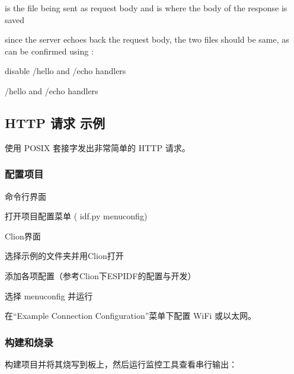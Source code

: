 \documentclass[a4paper,12pt,english]{sphinxmanual}
\begin{document}
{{\begin{sphinxVerbatim}[commandchars=\\\{\}]

 is the file being sent as request body and  is where the body of the response is saved

since the server echoes back the request body, the two files should be same, as can be confirmed using : 

 \PYGZhy{} disable /hello and /echo handlers

 \PYGZhy{}   /hello and /echo handlers
\end{sphinxVerbatim}


\subsection{HTTP 请求 示例}
\label{\detokenize{exp-esp32/http:http}}
\sphinxAtStartPar
使用 POSIX 套接字发出非常简单的 HTTP 请求。


\subsubsection{配置项目}
\label{\detokenize{exp-esp32/http:id7}}
\sphinxAtStartPar
命令行界面

\sphinxAtStartPar
打开项目配置菜单 ( idf.py menuconfig)

\sphinxAtStartPar
Clion界面

\sphinxAtStartPar
选择示例的文件夹并用Clion打开

\sphinxAtStartPar
添加各项配置（参考Clion下ESP\sphinxhyphen{}IDF的配置与开发）

\sphinxAtStartPar
选择 menuconfig 并运行

\sphinxAtStartPar
在“Example Connection Configuration”菜单下配置 Wi\sphinxhyphen{}Fi 或以太网。


\subsubsection{构建和烧录}
\label{\detokenize{exp-esp32/http:id8}}
\sphinxAtStartPar
构建项目并将其烧写到板上，然后运行监控工具查看串行输出：

}}
\end{document}
